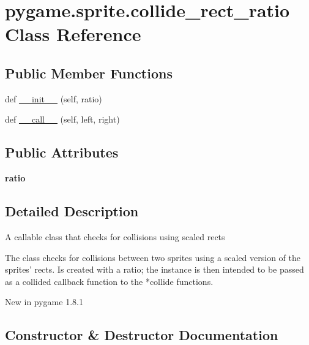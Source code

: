 \hypertarget{classpygame_1_1sprite_1_1collide__rect__ratio}{}\section{pygame.\+sprite.\+collide\+\_\+rect\+\_\+ratio Class Reference}
\label{classpygame_1_1sprite_1_1collide__rect__ratio}
\subsection*{Public Member Functions}
\begin{DoxyCompactItemize}
\item 
def \hyperlink{classpygame_1_1sprite_1_1collide__rect__ratio_a9545012c865757c2745d5dbfb304c9a8}{\+\_\+\+\_\+init\+\_\+\+\_\+} (self, ratio)
\item 
def \hyperlink{classpygame_1_1sprite_1_1collide__rect__ratio_a22ec6617fbedeafe60940938592dc3ee}{\+\_\+\+\_\+call\+\_\+\+\_\+} (self, left, right)
\end{DoxyCompactItemize}
\subsection*{Public Attributes}
\begin{DoxyCompactItemize}
\item 
\mbox{\label{classpygame_1_1sprite_1_1collide__rect__ratio_ad92a437054ce0d9d593dcd0e67108421}} 
{\bfseries ratio}
\end{DoxyCompactItemize}


\subsection{Detailed Description}
\begin{DoxyVerb}A callable class that checks for collisions using scaled rects

The class checks for collisions between two sprites using a scaled version
of the sprites' rects. Is created with a ratio; the instance is then
intended to be passed as a collided callback function to the *collide
functions.

New in pygame 1.8.1\end{DoxyVerb}
 

\subsection{Constructor \& Destructor Documentation}
\mbox{\label{classpygame_1_1sprite_1_1collide__rect__ratio_a9545012c865757c2745d5dbfb304c9a8}} 
